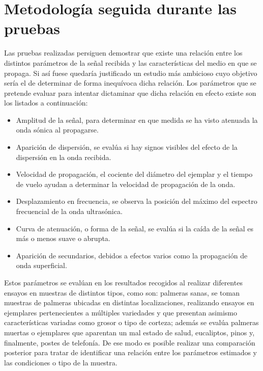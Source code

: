 \section{Metodología seguida durante las pruebas}\label{sec:methodology}

Las pruebas realizadas persiguen demostrar que existe una relación entre
los distintos parámetros de la señal recibida y las características del
medio en que se propaga. Si así fuese quedaría justificado un estudio más
ambicioso cuyo objetivo sería el de determinar de forma inequívoca dicha
relación. Los parámetros que se pretende evaluar para intentar dictaminar
que dicha relación en efecto existe son los listados a continuación:

\begin{itemize}
    \item Amplitud de la señal, para determinar en que medida se ha visto
	atenuada la onda sónica al propagarse.
    \item Aparición de dispersión, se evalúa si hay signos visibles del
	efecto de la dispersión en la onda recibida.
    \item Velocidad de propagación, el cociente del diámetro del ejemplar y
	el tiempo de vuelo ayudan a determinar la velocidad de propagación
	de la onda.
    \item Desplazamiento en frecuencia, se observa la posición del máximo
	del espectro frecuencial de la onda ultrasónica.
    \item Curva de atenuación, o forma de la señal, se evalúa si la caída
	de la señal es más o menos suave o abrupta.
    \item Aparición de secundarios, debidos a efectos varios como la
	propagación de onda superficial.
\end{itemize}

Estos parámetros se evalúan en los resultados recogidos al realizar
diferentes ensayos en muestras de distintos tipos, como son: palmeras
sanas, se toman muestras de palmeras ubicadas en distintas localizaciones,
realizando ensayos en ejemplares pertenecientes a múltiples variedades y
que presentan asimismo características variadas como grosor o tipo de
corteza; además se evalúa palmeras muertas o ejemplares que aparentan un
mal estado de salud, eucaliptos, pinos y, finalmente, postes de telefonía.
De ese modo es posible realizar una comparación posterior para tratar de
identificar una relación entre los parámetros estimados y las condiciones o
tipo de la muestra.


